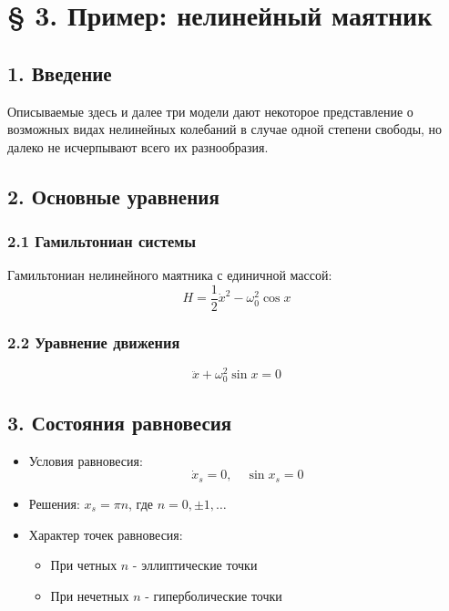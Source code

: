 \documentclass[10pt]{article}
\begin{document}
\section*{§ 3. Пример: нелинейный маятник}

\subsection*{1. Введение}
Описываемые здесь и далее три модели дают некоторое представление о возможных видах нелинейных колебаний в случае одной степени свободы, но далеко не исчерпывают всего их разнообразия.

\subsection*{2. Основные уравнения}
\subsubsection*{2.1 Гамильтониан системы}
Гамильтониан нелинейного маятника с единичной массой:
\begin{equation}
H=\frac{1}{2} \dot{x}^{2} - \omega_{0}^{2} \cos x
\end{equation}

\subsubsection*{2.2 Уравнение движения}
\begin{equation}
\ddot{x} + \omega_{0}^{2} \sin x = 0
\end{equation}

\subsection*{3. Состояния равновесия}
\begin{itemize}
    \item Условия равновесия:
    \[\dot{x}_{s} = 0, \quad \sin x_{s} = 0\]
    \item Решения: $x_{s} = \pi n$, где $n = 0, \pm 1, \ldots$
    \item Характер точек равновесия:
        \begin{itemize}
            \item При четных $n$ - эллиптические точки
            \item При нечетных $n$ - гиперболические точки
        \end{itemize}
\end{itemize}
\end{document}
